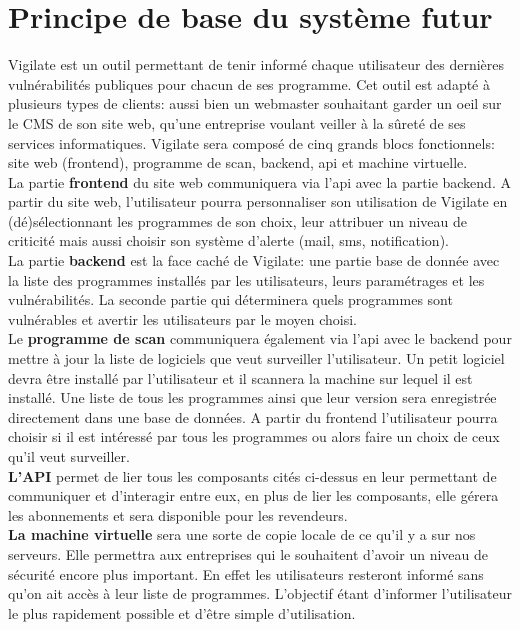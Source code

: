 \section{Principe de base du système futur}
Vigilate est un outil permettant de tenir informé chaque utilisateur des dernières vulnérabilités publiques pour chacun de ses programme. Cet outil est adapté à plusieurs types de clients: aussi bien un webmaster souhaitant garder un oeil sur le CMS de son site web, qu’une entreprise voulant veiller à la sûreté de ses services informatiques.
Vigilate sera composé de cinq grands blocs fonctionnels: site web (frontend), programme de scan, backend, api et machine virtuelle.
\\
La partie \textbf{frontend} du site web communiquera via l’api avec la partie backend. A partir du site web, l’utilisateur pourra personnaliser son utilisation de Vigilate en (dé)sélectionnant les programmes de son choix, leur attribuer un niveau de criticité mais aussi choisir son système d’alerte (mail, sms, notification).
\\
La partie \textbf{backend} est la face caché de Vigilate: une partie base de donnée avec la liste des programmes installés par les utilisateurs, leurs paramétrages et les vulnérabilités. La seconde partie qui déterminera quels programmes sont vulnérables et avertir les utilisateurs par le moyen choisi.
\\
Le \textbf{programme de scan} communiquera également via l’api avec le backend pour mettre à jour la liste de logiciels que veut surveiller l’utilisateur. Un petit logiciel devra être installé par l’utilisateur et il scannera la machine sur lequel il est installé. Une liste de tous les programmes ainsi que leur version sera enregistrée directement dans une base de données. A partir du frontend l’utilisateur pourra choisir si il est intéressé par tous les programmes ou alors faire un choix de ceux qu’il veut surveiller.
\\
\textbf{L’API}  permet de lier tous les composants cités ci-dessus en leur permettant de communiquer et d'interagir entre eux, en plus de lier les composants, elle gérera les abonnements et sera disponible pour les revendeurs.
\\
\textbf{La machine virtuelle} sera une sorte de copie locale de ce qu’il y a sur nos serveurs. Elle permettra aux entreprises qui le souhaitent d’avoir un niveau de sécurité encore plus important. En effet les utilisateurs resteront informé sans qu’on ait accès à leur liste de programmes.
L'objectif étant d’informer l’utilisateur le plus rapidement possible et d’être simple d’utilisation.
